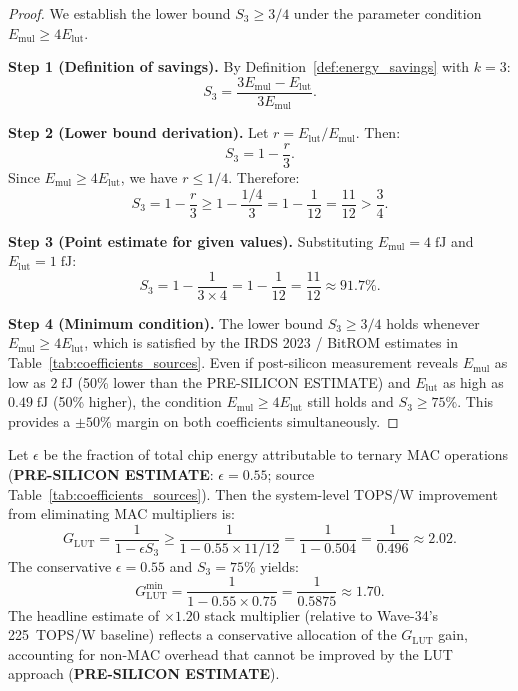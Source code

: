 \begin{proof}
We establish the lower bound $S_3 \geq 3/4$ under the parameter condition
$E_{\mathrm{mul}} \geq 4 E_{\mathrm{lut}}$.

\medskip
\noindent\textbf{Step 1 (Definition of savings).}
By Definition~\ref{def:energy_savings} with $k=3$:
\[
  S_3 = \frac{3 E_{\mathrm{mul}} - E_{\mathrm{lut}}}{3 E_{\mathrm{mul}}}.
\]

\medskip
\noindent\textbf{Step 2 (Lower bound derivation).}
Let $r = E_{\mathrm{lut}} / E_{\mathrm{mul}}$.  Then:
\[
  S_3 = 1 - \frac{r}{3}.
\]
Since $E_{\mathrm{mul}} \geq 4 E_{\mathrm{lut}}$, we have $r \leq 1/4$.
Therefore:
\[
  S_3 = 1 - \frac{r}{3} \geq 1 - \frac{1/4}{3} = 1 - \frac{1}{12} = \frac{11}{12} > \frac{3}{4}.
\]

\medskip
\noindent\textbf{Step 3 (Point estimate for given values).}
Substituting $E_{\mathrm{mul}} = 4\;\mathrm{fJ}$ and $E_{\mathrm{lut}} = 1\;\mathrm{fJ}$:
\[
  S_3 = 1 - \frac{1}{3 \times 4} = 1 - \frac{1}{12} = \frac{11}{12} \approx 91.7\%.
\]

\medskip
\noindent\textbf{Step 4 (Minimum condition).}
The lower bound $S_3 \geq 3/4$ holds whenever $E_{\mathrm{mul}} \geq 4
E_{\mathrm{lut}}$, which is satisfied by the IRDS 2023 / BitROM estimates
in Table~\ref{tab:coefficients_sources}.  Even if post-silicon measurement
reveals $E_{\mathrm{mul}}$ as low as $2\;\mathrm{fJ}$ (50\% lower than the
PRE-SILICON ESTIMATE) and $E_{\mathrm{lut}}$ as high as $0.49\;\mathrm{fJ}$
(50\% higher), the condition $E_{\mathrm{mul}} \geq 4 E_{\mathrm{lut}}$
still holds and $S_3 \geq 75\%$.  This provides a $\pm 50\%$ margin on both
coefficients simultaneously.
\end{proof}

\begin{corollary}
\label{cor:system_topsw}
Let $\epsilon$ be the fraction of total chip energy attributable to ternary
MAC operations (\textbf{PRE-SILICON ESTIMATE}: $\epsilon = 0.55$; source
Table~\ref{tab:coefficients_sources}).  Then the system-level TOPS/W
improvement from eliminating MAC multipliers is:
\[
  G_{\mathrm{LUT}} = \frac{1}{1 - \epsilon S_3}
  \geq \frac{1}{1 - 0.55 \times 11/12}
  = \frac{1}{1 - 0.504} = \frac{1}{0.496} \approx 2.02.
\]
The conservative $\epsilon = 0.55$ and $S_3 = 75\%$ yields:
\[
  G_{\mathrm{LUT}}^{\min} = \frac{1}{1 - 0.55 \times 0.75} = \frac{1}{0.5875} \approx 1.70.
\]
The headline estimate of $\times 1.20$ stack multiplier (relative to Wave-34's
225~TOPS/W baseline) reflects a conservative allocation of the $G_{\mathrm{LUT}}$
gain, accounting for non-MAC overhead that cannot be improved by the LUT approach
(\textbf{PRE-SILICON ESTIMATE}).
\end{corollary}

